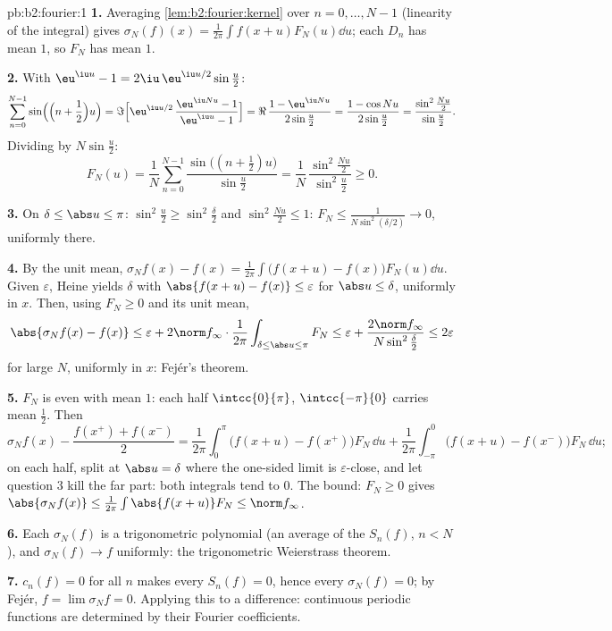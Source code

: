 \begin{solution}{pb:b2:fourier:1}
\textbf{1.} Averaging \cref{lem:b2:fourier:kernel} over $n = 0,
\dots, N-1$ (linearity of the integral) gives $\sigma_N(f)(x) =
\frac{1}{2\pi}\int f(x+u)F_N(u)\dd u$; each $D_n$ has mean
$1$, so $F_N$ has mean $1$.

\textbf{2.} With $\eu^{\iu u} - 1 = 2\iu\,\eu^{\iu
u/2}\sin\frac u2$:
\[
\sum_{n=0}^{N-1}\sin\Bigl(\Bigl(n + \frac12\Bigr)u\Bigr)
= \Im\Bigl[\eu^{\iu u/2}\,\frac{\eu^{\iu Nu} - 1}{\eu^{\iu u}
- 1}\Bigr]
= \Re\,\frac{1 - \eu^{\iu Nu}}{2\sin\frac u2}
= \frac{1 - \cos Nu}{2\sin\frac u2}
= \frac{\sin^2\frac{Nu}2}{\sin\frac u2} .
\]
Dividing by $N\sin\frac u2$:
\[
F_N(u) = \frac1N\sum_{n=0}^{N-1}
\frac{\sin\bigl((n+\frac12)u\bigr)}{\sin\frac u2}
= \frac{1}{N}\,
\frac{\sin^2\frac{Nu}{2}}{\sin^2\frac u2} \geq 0 .
\]

\textbf{3.} On $\delta \leq \abs u \leq \pi$: $\sin^2\frac u2
\geq \sin^2\frac\delta2$ and $\sin^2\frac{Nu}2 \leq 1$: $F_N
\leq \frac{1}{N\sin^2(\delta/2)} \to 0$, uniformly there.

\textbf{4.} By the unit mean, $\sigma_Nf(x) - f(x) =
\frac{1}{2\pi}\int\bigl(f(x+u) - f(x)\bigr)F_N(u)\dd u$. Given
$\varepsilon$, Heine yields $\delta$ with $\abs{f(x+u) - f(x)}
\leq \varepsilon$ for $\abs u \leq \delta$, uniformly in $x$.
Then, using $F_N \geq 0$ and its unit mean,
\[
\abs{\sigma_Nf(x) - f(x)}
\leq \varepsilon +
2\norm f_\infty\cdot\frac{1}{2\pi}
\int_{\delta\leq\abs u\leq\pi}F_N
\leq \varepsilon + \frac{2\norm
f_\infty}{N\sin^2\frac\delta2}
\leq 2\varepsilon
\]
for large $N$, uniformly in $x$: Fej\'er's theorem.

\textbf{5.} $F_N$ is even with mean $1$: each half
$\intcc{0}{\pi}$, $\intcc{-\pi}{0}$ carries mean $\frac12$.
Then
\[
\sigma_Nf(x) - \frac{f(x^+)+f(x^-)}{2}
= \frac{1}{2\pi}\int_0^\pi\bigl(f(x+u) -
f(x^+)\bigr)F_N\,\dd u
+ \frac{1}{2\pi}\int_{-\pi}^0\bigl(f(x+u) -
f(x^-)\bigr)F_N\,\dd u ;
\]
on each half, split at $\abs u = \delta$ where the one-sided
limit is $\varepsilon$-close, and let question 3 kill the far
part: both integrals tend to $0$. The bound: $F_N \geq 0$
gives $\abs{\sigma_Nf(x)} \leq
\frac{1}{2\pi}\int\abs{f(x+u)}F_N \leq \norm f_\infty$.

\textbf{6.} Each $\sigma_N(f)$ is a trigonometric polynomial
(an average of the $S_n(f)$, $n < N$), and $\sigma_N(f) \to f$
uniformly: the trigonometric Weierstrass theorem.

\textbf{7.} $c_n(f) = 0$ for all $n$ makes every $S_n(f) = 0$,
hence every $\sigma_N(f) = 0$; by Fej\'er, $f = \lim\sigma_Nf =
0$. Applying this to a difference: continuous periodic
functions are determined by their Fourier coefficients.


\end{solution}
